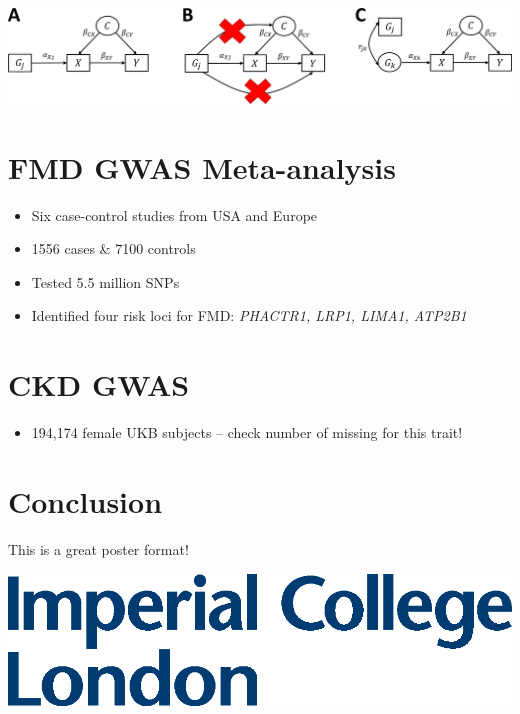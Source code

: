 \documentclass[a0paper,fleqn]{betterposter}
\begin{document}
{%
    \includegraphics[width=\textwidth]{mr.png} %
    \cite{de2022understanding}


\section{FMD GWAS Meta-analysis \cite{georges2021genetic}}

\begin{itemize}
\item Six case-control studies from USA and Europe  
\item 1556 cases \& 7100 controls  
\item Tested 5.5 million SNPs  
\item Identified four risk loci for FMD: \textit{PHACTR1, LRP1, LIMA1, ATP2B1}  
\end{itemize}


\section{CKD GWAS \cite{neale_lab_gwas}}

\begin{itemize}
\item 194,174 female UKB subjects -- check number of missing for this trait!
\end{itemize}





\section{Conclusion}
This is a great poster format!



\vfill

\includegraphics[width=\textwidth]{img/logo}\\

}
\end{document}
